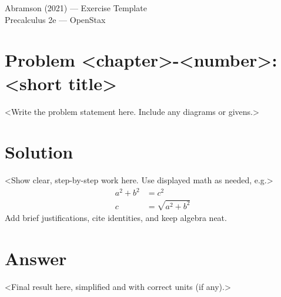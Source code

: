 \documentclass[12pt]{article}
\newenvironment{problem}[1]{\section*{Problem #1}}{}
\newenvironment{solution}{\section*{Solution}}{}
\newenvironment{answer}{\section*{Answer}}{}
\begin{document}
\begin{center}
    {\LARGE Abramson (2021) --- Exercise Template}\\[0.5em]
    {\large Precalculus 2e --- OpenStax}
\end{center}

\begin{problem}{<chapter>-<number>: <short title>}
<Write the problem statement here. Include any diagrams or givens.>
\end{problem}

\begin{solution}
<Show clear, step-by-step work here. Use displayed math as needed, e.g.>
\begin{align*}
    a^2 + b^2 &= c^2\\
    c &= \sqrt{a^2 + b^2}
\end{align*}
Add brief justifications, cite identities, and keep algebra neat.
\end{solution}

\begin{answer}
<Final result here, simplified and with correct units (if any).>
\end{answer}
\end{document}

